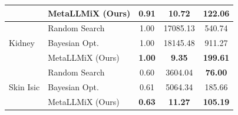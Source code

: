 \documentclass{article}
\begin{document}
\begin{table}[H]
\begin{tabular}{llccc}
  & MetaLLMiX (Ours) & \textbf{0.91} & \textbf{10.72} & \textbf{122.06} \\
\midrule
\multirow{3}{*}{Kidney}
  & Random Search & 1.00 & 17085.13 & 540.74 \\
  & Bayesian Opt. & 1.00 & 18145.48 & 911.27 \\
  & MetaLLMiX (Ours) & \textbf{1.00} & \textbf{9.35} & \textbf{199.61} \\
\midrule
\multirow{3}{*}{Skin Isic}
  & Random Search & 0.60 & 3604.04 & \textbf{76.00} \\
  & Bayesian Opt. & 0.61 & 5064.34 & 185.66 \\
  & MetaLLMiX (Ours) & \textbf{0.63} & \textbf{11.27} & \textbf{105.19} \\
\bottomrule
\end{tabular}
\end{table}
\end{document}
